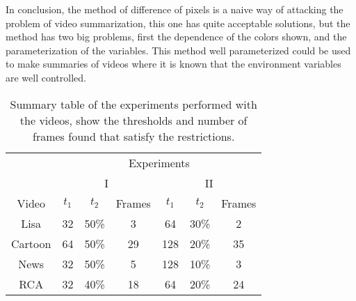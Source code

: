 \documentclass[journal]{IEEEtran}
\begin{document}
In conclusion, the method of difference of pixels is a naive way of attacking the problem of video summarization, this one has quite acceptable solutions, but the method has two big problems, first the dependence of the colors shown, and the parameterization of the variables. This method well parameterized could be used to make summaries of videos where it is known that the environment variables are well controlled.


\begin{table}
	\centering
	\begin{tabular}{ | c | c | c | c | c | c | c |}
		\hline
		& \multicolumn{6}{|c|}{Experiments} \\ 
		\cline{2-7}
		& \multicolumn{3}{|c|}{I} &  \multicolumn{3}{|c|}{II} \\
		\hline
		Video  & $t_1$ & $t_2$ & Frames & $t_1$ & $t_2$ & Frames  \\
		\hline
		Lisa & 32 & 50\% & 3 & 64 & 30\% & 2 \\
		Cartoon & 64 & 50\% & 29 & 128 & 20\% & 35 \\
		News & 32 & 50\% & 5 & 128 & 10\% & 3 \\
		RCA & 32 & 40\% & 18 & 64 & 20\% & 24 \\
		
		\hline
	\end{tabular}
	\caption{Summary table of the experiments performed with the videos, show the thresholds and number of frames found that satisfy the restrictions.}
	\label{tab:table:pixel_difference}
\end{table}
\end{document}

